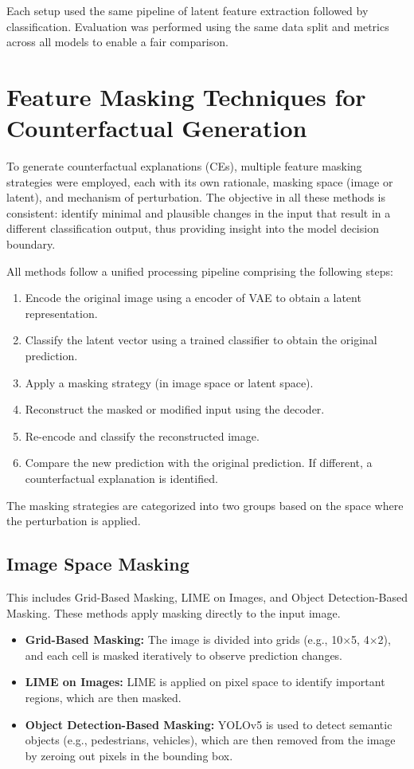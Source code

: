 Each setup used the same pipeline of latent feature extraction followed by classification. Evaluation was performed using the same data split and metrics across all models to enable a fair comparison.


\section{Feature Masking Techniques for Counterfactual Generation}
\label{sec:feature_masking_pipeline}

To generate counterfactual explanations (CEs), multiple feature masking strategies were employed, each with its own rationale, masking space (image or latent), and mechanism of perturbation. The objective in all these methods is consistent: identify minimal and plausible changes in the input that result in a different classification output, thus providing insight into the model decision boundary.

All methods follow a unified processing pipeline comprising the following steps:
\begin{enumerate}
    \item Encode the original image using a encoder of VAE to obtain a latent representation.
    \item Classify the latent vector using a trained classifier to obtain the original prediction.
    \item Apply a masking strategy (in image space or latent space).
    \item Reconstruct the masked or modified input using the decoder.
    \item Re-encode and classify the reconstructed image.
    \item Compare the new prediction with the original prediction. If different, a counterfactual explanation is identified.
\end{enumerate}

The masking strategies are categorized into two groups based on the space where the perturbation is applied.

\subsection*{Image Space Masking}
This includes Grid-Based Masking, LIME on Images, and Object Detection-Based Masking. These methods apply masking directly to the input image.
\begin{itemize}
    \item \textbf{Grid-Based Masking:} The image is divided into grids (e.g., 10$\times$5, 4$\times$2), and each cell is masked iteratively to observe prediction changes.
    \item \textbf{LIME on Images:} LIME is applied on pixel space to identify important regions, which are then masked.
    \item \textbf{Object Detection-Based Masking:} YOLOv5 is used to detect semantic objects (e.g., pedestrians, vehicles), which are then removed from the image by zeroing out pixels in the bounding box.
\end{itemize}

